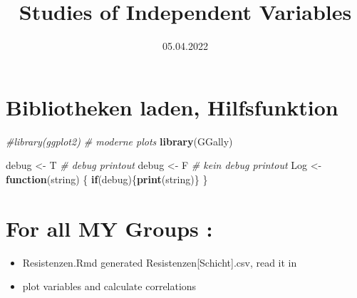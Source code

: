 \documentclass[
]{article}
\title{Studies of Independent Variables}
\author{}
\date{\vspace{-2.5em}05.04.2022}
\newenvironment{Shaded}{\begin{snugshade}}{\end{snugshade}}
\newcommand{\CommentTok}[1]{\textcolor[rgb]{0.56,0.35,0.01}{\textit{#1}}}
\newcommand{\ControlFlowTok}[1]{\textcolor[rgb]{0.13,0.29,0.53}{\textbf{#1}}}
\newcommand{\KeywordTok}[1]{\textcolor[rgb]{0.13,0.29,0.53}{\textbf{#1}}}
\newcommand{\NormalTok}[1]{#1}
\newcommand{\StringTok}[1]{\textcolor[rgb]{0.31,0.60,0.02}{#1}}
\providecommand{\tightlist}{%
  \setlength{\itemsep}{0pt}\setlength{\parskip}{0pt}}
\begin{document}
\maketitle

\hypertarget{bibliotheken-laden-hilfsfunktion}{%
\section{Bibliotheken laden,
Hilfsfunktion}\label{bibliotheken-laden-hilfsfunktion}}

\begin{Shaded}
\begin{Highlighting}[]
\CommentTok{#library(ggplot2)     # moderne plots}
\KeywordTok{library}\NormalTok{(GGally)}

\NormalTok{debug <-}\StringTok{ }\NormalTok{T           }\CommentTok{# debug printout}
\NormalTok{debug <-}\StringTok{ }\NormalTok{F           }\CommentTok{# kein debug printout}
\NormalTok{Log <-}\StringTok{ }\ControlFlowTok{function}\NormalTok{(string) \{}
  \ControlFlowTok{if}\NormalTok{(debug)\{}\KeywordTok{print}\NormalTok{(string)\}  }
\NormalTok{\}}
\end{Highlighting}
\end{Shaded}

\hypertarget{for-all-my-groups}{%
\section{For all MY Groups :}\label{for-all-my-groups}}

\begin{itemize}
\tightlist
\item
  Resistenzen.Rmd generated Resistenzen{[}Schicht{]}.csv, read it in
\item
  plot variables and calculate correlations
\end{itemize}
\end{document}
